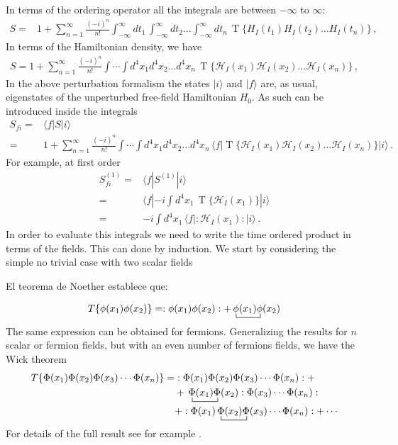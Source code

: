 In terms of the ordering operator all the integrals are between $-\infty$ to $\infty$:
\begin{align}
   S=&1+\sum_{n=1}^\infty\frac{(-i)^n}{n!}\int_{-\infty}^{\infty}d t_1\,\int_{-\infty}^{\infty} d t_2\ldots\int_{-\infty}^{\infty}d t_n\,\operatorname{T}\{{H}_I(t_1){H}_I(t_2)\ldots{H}_I(t_n)\}\,, 
\end{align}
In terms of the Hamiltonian density, we have
\begin{align}
  S=1+\sum_{n=1}^\infty\frac{(-i)^n}{n!}\int\cdots\int d^4x_1 d^4x_2\ldots d^4x_n\,\operatorname{T}\{\mathcal{H}_I(x_1)\mathcal{H}_I(x_2)\ldots\mathcal{H}_I(x_n)\}\,, 
\end{align}
In the above perturbation formalism the states $|i\rangle$ and $|f\rangle$ are, as usual, eigenstates of the unperturbed free-field Hamiltonian $H_0$. As such can be introduced inside the integrals
\begin{align}
  S_{f i}=&\langle f|S|i\rangle\nonumber\\
  =&1+\sum_{n=1}^\infty\frac{(-i)^n}{n!}\int\cdots\int d^4x_1 d^4x_2\ldots d^4x_n\,\langle f|\operatorname{T}\{\mathcal{H}_I(x_1)\mathcal{H}_I(x_2)\ldots\mathcal{H}_I(x_n)\}|i\rangle\,.
\end{align}
For example, at first order
\begin{align}
  \label{eq:96f}
  S_{fi}^{(1)}=&\langle f|S^{(1)}|i\rangle\nonumber\\
  =&\langle f|-i\int d^4x_1\,\operatorname{T}\{\mathcal{H}_I(x_1)\}|i\rangle\nonumber\\
  =&-i\int d^4x_1\,\langle f|:\mathcal{H}_I(x_1):|i\rangle\,.
\end{align}
In order to evaluate this integrals we need to write the time ordered product in terms of the fields. This can done by induction. We start by considering the simple no trivial case with two scalar fields

El teorema de Noether establece que:

\begin{align}
  T\{\phi(x_1)\phi(x_2)\}=:\phi(x_1)\phi(x_2):+\bcontraction{\,}{\phi}{(x_1)}{\phi}
\,\phi(x_1)\phi(x_2)
\end{align}
The same expression can be obtained for fermions. Generalizing  the results for $n$ scalar or fermion fields, but with an even number of fermions fields, we have the Wick theorem
\begin{align}
  T\{\Phi(x_1)\Phi(x_2)\Phi(x_3)\cdots\Phi(x_n) \}
=&:\Phi(x_1)\Phi(x_2)\Phi(x_3)\cdots\Phi(x_n):+\nonumber\\
&+\bcontraction{\,}{\Phi}{(x_1)}{\Phi}\,\Phi(x_1)\Phi(x_2):\Phi(x_3)\cdots\Phi(x_n):\nonumber\\
&+:\Phi(x_1)\bcontraction{\,}{\Phi}{(x_2)}{\Phi}\,\Phi(x_2)\Phi(x_3)\cdots\Phi(x_n):+\cdots 
\end{align}
For details of the full result see for example \cite{Lahiri:2005sm}.


